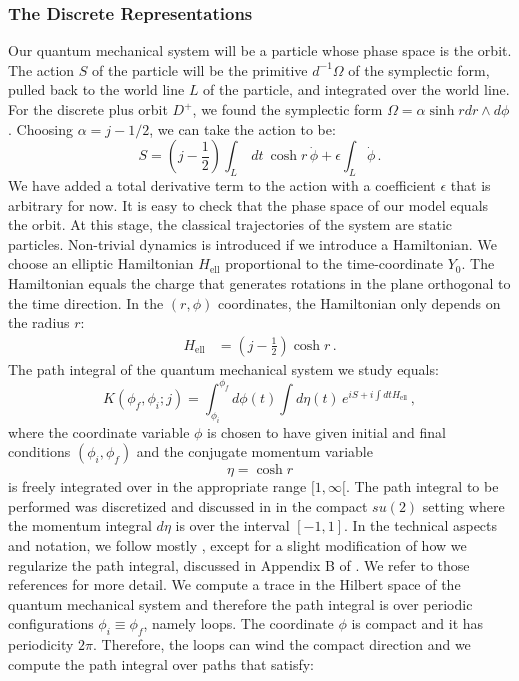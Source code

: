 \documentclass[12pt]{article}
\numberwithin{equation}{section}
\numberwithin{equation}{section}
\numberwithin{table}{section}\setlength{\multlinegap}{25pt}
\begin{document}
\subsubsection{The Discrete Representations}
Our quantum mechanical system will be a particle whose phase space is the orbit. The action $S$ of the particle will be the primitive $d^{-1} \Omega$ of the symplectic form, pulled back to the world line $L$ of the particle, and integrated over the world line.
For the discrete plus orbit $D^+$, we found the symplectic form $\Omega=\alpha \sinh r dr \wedge d \phi$. Choosing $\alpha=j-1/2$, we can take the action to be:
\begin{equation}
S = (j-\frac{1}{2}) \int_L~dt~ \cosh r \, \dot{\phi} + \epsilon \int_L  \dot{\phi}
\, .
\label{DiscreteOrbitEllipticAction}
\end{equation}
We have added a total derivative term to the action with a coefficient $\epsilon$ that is arbitrary for now. It is easy to check that the phase space of our model equals the orbit. 
At this stage, the classical trajectories of the system  are static particles. Non-trivial dynamics is introduced if we introduce a Hamiltonian. We choose an elliptic Hamiltonian $H_{\text{ell}}$ proportional to the time-coordinate $Y_0$. The Hamiltonian equals the charge that generates rotations in the plane orthogonal to the time direction.
In the $(r,\phi)$ coordinates, the Hamiltonian only depends on the radius $r$:
\begin{align}
H_{\text{ell}}  &=    (j-\frac{1}{2}) \cosh r  \, .
\end{align}
The path integral of the quantum mechanical system we study equals:
\begin{equation}
K(\phi_f,\phi_i; j) = \int_{\phi_i}^{\phi_f} d \phi(t) \int d \eta(t) \, 
e^{iS + i \int dt H_{\text{ell}} } \, ,
\end{equation}
where the coordinate variable $\phi$ is chosen to have given initial and final conditions $(\phi_i,\phi_f)$ and the conjugate momentum variable 
\begin{equation}
\eta = \cosh r
\end{equation}
is freely integrated over in the appropriate range $[1,\infty[$. 
The path integral to be performed was discretized and discussed in \cite{Nielsen:1987sa,Johnson:1988qm,Alekseev:1988vx} in the compact $su(2)$ setting where the momentum integral $d \eta$ is over the interval $[-1,1]$. In the technical aspects and notation, we follow mostly \cite{Alekseev:1988vx}, except for a slight modification of how we regularize the path integral, discussed in Appendix B of \cite{Troost:2003ge}. We refer to those references for more detail. We compute a trace in the Hilbert space of the quantum mechanical system and therefore the path integral is over periodic configurations $\phi_i \equiv \phi_f$, namely loops. The coordinate $\phi$ is compact and it has periodicity $2 \pi$. Therefore, the loops can wind the compact direction and we compute the path integral over paths that satisfy:
\end{document}
